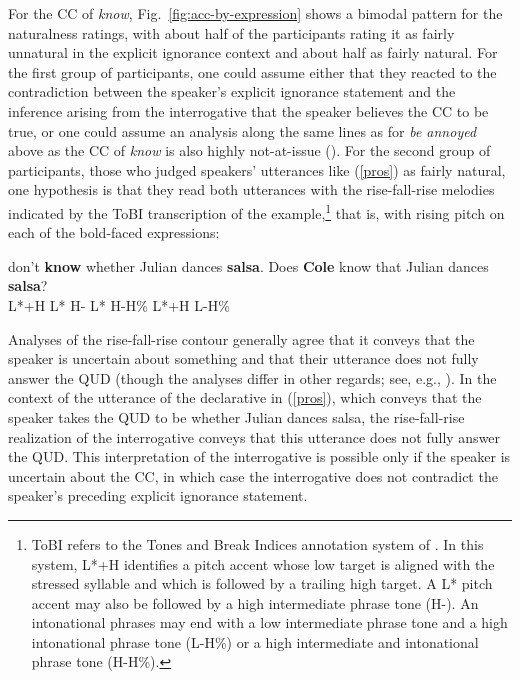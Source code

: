 \documentclass[11pt,fleqn]{article}
\newcommand{\6}{\mbox{$[\hspace*{-.6mm}[$}}
\newcommand{\9}{\mbox{$]\hspace*{-.6mm}]$}}
\begin{document}
For the CC of {\em know}, Fig.~\ref{fig:acc-by-expression} shows a bimodal pattern for the naturalness ratings, with about half of the participants rating it as fairly unnatural in the explicit ignorance context and about half as fairly natural. For the first group of participants, one could assume either that they reacted to the contradiction between the speaker's explicit ignorance statement and the inference arising from the interrogative that the speaker believes the CC to be true, or one could assume an analysis along the same lines as for {\em be annoyed} above as the CC of {\em know} is also highly not-at-issue (\citealt{tbd-variability}). For the second group of participants, those who judged speakers' utterances like (\ref{pros}) as fairly natural, one hypothesis is that they read both utterances with the rise-fall-rise melodies indicated by the ToBI transcription of the example,\footnote{ToBI refers to the Tones and Break Indices annotation system of \citealt{beckman-ayers97}. In this system, L*+H identifies a pitch accent whose low target is aligned with the stressed syllable and which is followed by a trailing high target. A L* pitch accent may also be followed by a high intermediate phrase tone (H-). An intonational phrases may end with a low intermediate phrase tone and a high intonational phrase tone (L-H\%) or a high intermediate and intonational phrase tone (H-H\%).} that is, with rising pitch on each of the bold-faced expressions:

\begin{exe}
\ex\label{pros}  don't {\bf know} whether Julian dances {\bf salsa}. Does {\bf Cole} know that Julian dances {\bf salsa}? 
\\ L*+H {} {L* H-} {} {} {} {L* H-H\%} {} L*+H {} {} {} {} {\hspace*{.2cm} L-H\%} \\ \glt 
\end{exe}
Analyses of the rise-fall-rise contour generally agree that it conveys that the speaker is uncertain about something and that their utterance does not fully answer the QUD (though the analyses differ in other regards; see, e.g., \citealt{ward-hirschberg85,buering97,buering03,wagner-etal2013}). In the context of the utterance of the declarative in (\ref{pros}), which conveys that the speaker takes the QUD to be whether Julian dances salsa, the rise-fall-rise realization of the interrogative conveys that this utterance does not fully answer the QUD. This interpretation of the interrogative is possible only if the speaker is uncertain about the CC, in which case the interrogative does not contradict the speaker's preceding explicit ignorance statement.
\end{document}

